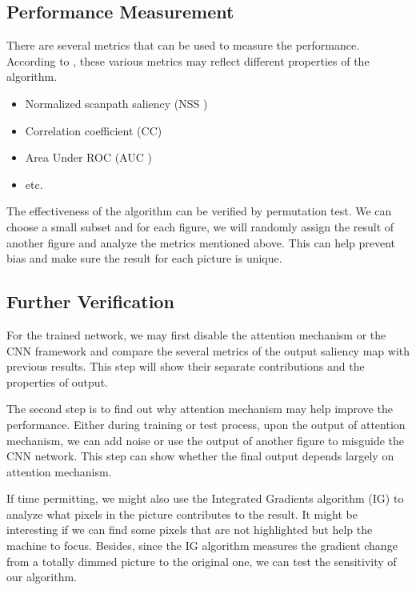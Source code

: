 \documentclass[12pt]{article}
\begin{document}
\subsection{Performance Measurement}

There are several metrics that can be used to measure the performance. According to \cite{riche2013saliency}, these various metrics may reflect different properties of the algorithm.
\begin{itemize}
    \item Normalized scanpath saliency (NSS \cite{petersComponentsBottomupGaze2005})
    \item Correlation coefficient (CC)
    \item Area Under ROC (AUC \cite{richeSaliencyHumanFixations2013})
    \item etc.
\end{itemize}
The effectiveness of the algorithm can be verified by permutation test. We can choose a small subset and for each figure, we will randomly assign the result of another figure and analyze the metrics mentioned above. This can help prevent bias and make sure the result for each picture is unique.

\subsection{Further Verification}

For the trained network, we may first disable the attention mechanism or the CNN framework and compare the several metrics of the output saliency map with previous results. 
This step will show their separate contributions and the properties of output.

The second step is to find out why attention mechanism may help improve the performance. 
Either during training or test process, upon the output of attention mechanism, we can add noise or use the output of another figure to misguide the CNN network. 
This step can show whether the final output depends largely on attention mechanism.

If time permitting, we might also use the Integrated Gradients algorithm (IG) \cite{sundararajan2017axiomatic} to analyze what pixels in the picture contributes to the result. 
It might be interesting if we can find some pixels that are not highlighted but help the machine to focus. 
Besides, since the IG algorithm measures the gradient change from a totally dimmed picture to the original one, we can test the sensitivity of our algorithm.
\end{document}
